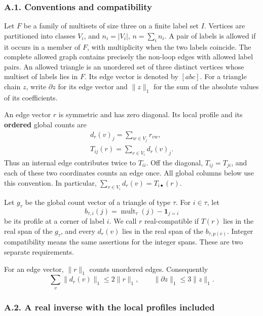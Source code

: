 \documentclass[english,11pt,a4paper]{article}
\begin{document}
\subsubsection{A.1. Conventions and compatibility}\label{a.1.-conventions-and-compatibility}

Let \(F\) be a family of multisets of size three on a finite label set \(I\). Vertices are partitioned into classes \(V_i\), and \(n_i=|V_i|\), \(n=\sum_i n_i\). A pair of labels is allowed if it occurs in a member of \(F\), with multiplicity when the two labels coincide. The complete allowed graph contains precisely the non-loop edges with allowed label pairs. An allowed triangle is an unordered set of three distinct vertices whose multiset of labels lies in \(F\). Its edge vector is denoted by \([abc]\). For a triangle chain \(z\), write \(\partial z\) for its edge vector and \(\|z\|_1\) for the sum of the absolute values of its coefficients.

An edge vector \(r\) is symmetric and has zero diagonal. Its local profile and its \textbf{ordered} global counts are \[\begin{gathered}
d_r(v)_j=\sum_{w\in V_j}r_{vw},\\
T_{ij}(r)=\sum_{v\in V_i}d_r(v)_j.
\end{gathered}\] Thus an internal edge contributes twice to \(T_{ii}\). Off the diagonal, \(T_{ij}=T_{ji}\), and each of these two coordinates counts an edge once. All global columns below use this convention. In particular, \(\sum_{v\in V_i}d_r(v)=T_{i\bullet}(r)\).

Let \(g_\tau\) be the global count vector of a triangle of type \(\tau\). For \(i\in\tau\), let \[b_{\tau,i}(j)=\operatorname{mult}_\tau(j)-\mathbf1_{j=i}\] be its profile at a corner of label \(i\). We call \(r\) real-compatible if \(T(r)\) lies in the real span of the \(g_\tau\), and every \(d_r(v)\) lies in the real span of the \(b_{\tau,p(v)}\). Integer compatibility means the same assertions for the integer spans. These are two separate requirements.

For an edge vector, \(\|r\|_1\) counts unordered edges. Consequently \[\sum_v\|d_r(v)\|_1\le 2\|r\|_1,
\qquad \|\partial z\|_1\le3\|z\|_1.
\tag{A.1.1}\]

\subsubsection{A.2. A real inverse with the local profiles included}\label{a.2.-a-real-inverse-with-the-local-profiles-included}
\end{document}

